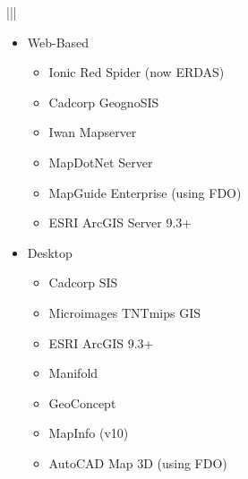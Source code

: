 \documentclass[a4paper,11pt,english]{sphinxmanual}
\begin{document}
\begin{savenotes}
\begin{tabular}[t]{|*{2}{|}}
\begin{itemize}
\begin{itemize}
\end{itemize}

\item {} 
Web-Based
\begin{itemize}
\item {} 
Ionic Red Spider (now ERDAS)

\item {} 
Cadcorp GeognoSIS

\item {} 
Iwan Mapserver

\item {} 
MapDotNet Server

\item {} 
MapGuide Enterprise (using FDO)

\item {} 
ESRI ArcGIS Server 9.3+

\end{itemize}

\item {} 
Desktop
\begin{itemize}
\item {} 
Cadcorp SIS

\item {} 
Microimages TNTmips GIS

\item {} 
ESRI ArcGIS 9.3+

\item {} 
Manifold

\item {} 
GeoConcept

\item {} 
MapInfo (v10)

\item {} 
AutoCAD Map 3D (using FDO)

\end{itemize}

\end{itemize}
\\
\hline
\end{tabular}
\par
\sphinxattableend\end{savenotes}
\end{document}

